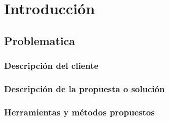 \section{Introducción}

\subsection{Problematica}
\subsubsection{Descripción del cliente}
\subsubsection{Descripción de la propuesta o solución}
\subsubsection{Herramientas y métodos propuestos}
